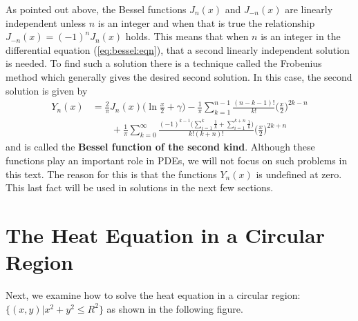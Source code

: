 As pointed out above, the Bessel functions $J_n(x)$ and $J_{-n}(x)$ are linearly independent unless $n$ is an integer and when that is true the relationship $J_{-n}(x)=(-1)^n J_n(x)$ holds.  This means that when $n$ is an integer in the differential equation (\ref{eq:bessel:eqn}), that a second linearly independent solution is needed.  To find such a solution there is a technique called the Frobenius method which generally gives the desired second solution.  In this case, the second solution is given by
%
\begin{align*}
Y_n(x) & = \frac{2}{\pi} J_n(x) \biggl(\ln \frac{x}{2} + \gamma\biggr)- \frac{1}{\pi} \sum_{k=1}^{n-1} \frac{(n-k-1)!}{k!} \biggl(\frac{x}{2}\biggr)^{2k-n} \\
& \qquad + \frac{1}{\pi} \sum_{k=0}^{\infty} \frac{(-1)^{k-1} \bigl( \sum_{i=1}^k \frac{1}{k} + \sum_{i=1}^{k+n} \frac{1}{k} \bigr)}{k! (k+n)!} \biggl(\frac{x}{2}\biggr)^{2k+n}
\end{align*}
and is called the \textbf{Bessel function of the second kind}.  Although these functions play an important role in PDEs, we will not focus on such problems in this text.  The reason for this is that the functions $Y_n(x)$ is undefined at zero.  This last fact will be used in solutions in the next few sections.



\section{The Heat Equation in a Circular Region} \label{sect:heat:eqn:polar}

Next, we examine how to solve the heat equation in a circular region: $\{ (x,y) | x^2+y^2 \leq R^2 \}$ as shown in the following figure.
%
\begin{center}
\end{center}


